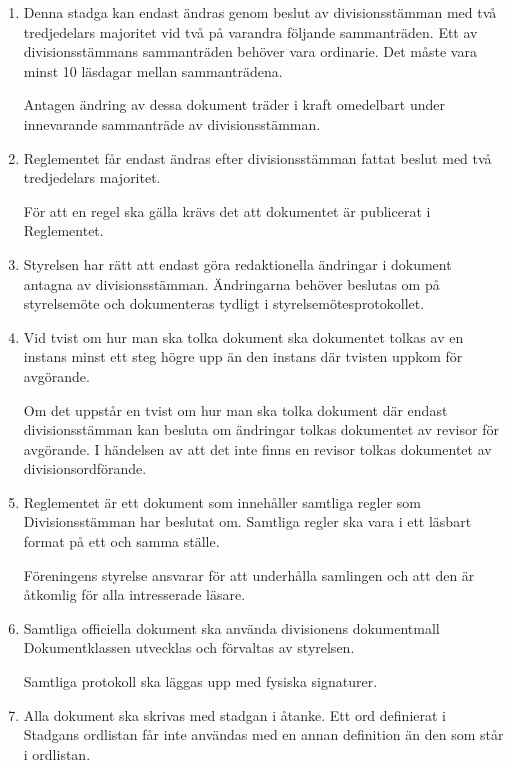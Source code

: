 \documentclass{dvd}
\begin{document}
	\begin{enumerate}[label=\arabic* §, ref=\arabic*]
		\item Denna stadga kan endast ändras genom beslut av divisionsstämman med två tredjedelars majoritet vid två på varandra följande sammanträden.
		Ett av divisionsstämmans sammanträden behöver vara ordinarie.
		Det måste vara minst 10 läsdagar mellan sammanträdena.

		Antagen ändring av dessa dokument träder i kraft omedelbart under innevarande sammanträde av divisionsstämman.

		\item Reglementet får endast ändras efter divisionsstämman fattat beslut med två tredjedelars majoritet.

                    För att en regel ska gälla krävs det att dokumentet är publicerat i Reglementet.

		\item Styrelsen har rätt att endast göra redaktionella ändringar i dokument antagna av divisionsstämman.
		Ändringarna behöver beslutas om på styrelsemöte och dokumenteras tydligt i styrelsemötesprotokollet.

		\item Vid tvist om hur man ska tolka dokument ska dokumentet tolkas av en instans minst ett steg högre upp än den instans där tvisten uppkom för avgörande.

		Om det uppstår en tvist om hur man ska tolka dokument där endast divisionsstämman kan besluta om ändringar tolkas dokumentet av revisor för avgörande. I händelsen av att det inte finns en revisor tolkas dokumentet av divisionsordförande.

		\item Reglementet är ett dokument som innehåller samtliga regler som Divisionsstämman har beslutat om. Samtliga regler ska vara i ett läsbart format på ett och samma ställe.

		Föreningens styrelse ansvarar för att underhålla samlingen och att den är åtkomlig för alla intresserade läsare.
		
		\item Samtliga officiella dokument ska använda divisionens dokumentmall
		Dokumentklassen utvecklas och förvaltas av styrelsen.

		Samtliga protokoll ska läggas upp med fysiska signaturer.
		
		\item Alla dokument ska skrivas med stadgan i åtanke.
		Ett ord definierat i Stadgans ordlistan får inte användas med en annan definition än den som står i ordlistan.


\end{enumerate}
\end{document}
